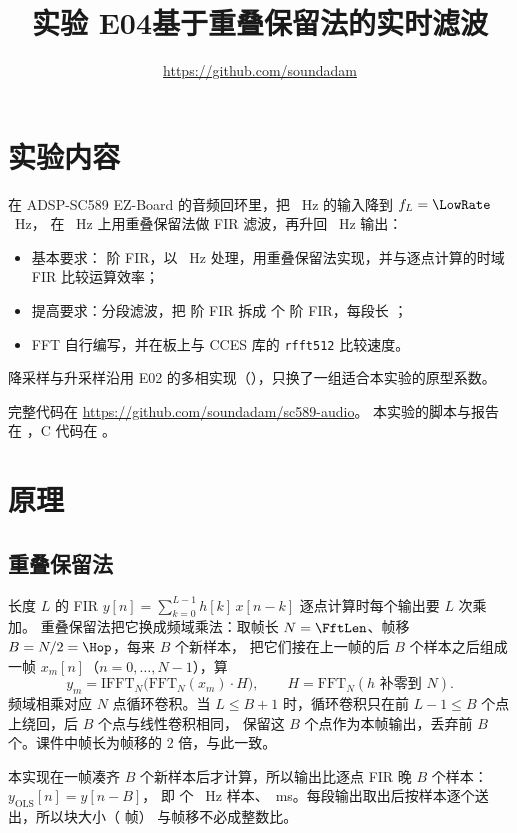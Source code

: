 \documentclass[zihao=-4, linespread=1.5, fontset=none]{ctexart}
\title{实验 E04\quad 基于重叠保留法的实时滤波}
\author{\ReportAuthor\quad\url{https://github.com/soundadam}}
\date{}
\begin{document}
\maketitle

\section{实验内容}

在 ADSP-SC589 EZ-Board 的音频回环里，把 \SampleRate~Hz 的输入降到 $f_L=\LowRate$~Hz，
在 \LowRate~Hz 上用重叠保留法做 FIR 滤波，再升回 \SampleRate~Hz 输出：
\begin{itemize}
  \item 基本要求：\ShortOrder{} 阶 FIR，以 \LowRate~Hz 处理，用重叠保留法实现，并与逐点计算的时域 FIR 比较运算效率；
  \item 提高要求：分段滤波，把 \LongOrder{} 阶 FIR 拆成 \Parts{} 个 \ShortOrder{} 阶 FIR，每段长 \Hop；
  \item FFT 自行编写，并在板上与 CCES 库的 \texttt{rfft512} 比较速度。
\end{itemize}
降采样与升采样沿用 E02 的多相实现（），只换了一组适合本实验的原型系数。

完整代码在 \url{https://github.com/soundadam/sc589-audio}。
本实验的脚本与报告在 ，C 代码在 。

\section{原理}

\subsection{重叠保留法}

长度 $L$ 的 FIR $y[n]=\sum_{k=0}^{L-1}h[k]\,x[n-k]$ 逐点计算时每个输出要 $L$ 次乘加。
重叠保留法把它换成频域乘法：取帧长 $N=\FftLen$、帧移 $B=N/2=\Hop$，每来 $B$ 个新样本，
把它们接在上一帧的后 $B$ 个样本之后组成一帧 $x_m[n]$（$n=0,\dots,N-1$），算
\[
  y_m = \mathrm{IFFT}_N\bigl(\mathrm{FFT}_N(x_m)\cdot H\bigr),\qquad H=\mathrm{FFT}_N(h\text{ 补零到 }N).
\]
频域相乘对应 $N$ 点循环卷积。当 $L\le B+1$ 时，循环卷积只在前 $L-1\le B$ 个点上绕回，后 $B$ 个点与线性卷积相同，
保留这 $B$ 个点作为本帧输出，丢弃前 $B$ 个。课件中帧长为帧移的 2 倍，与此一致。

本实现在一帧凑齐 $B$ 个新样本后才计算，所以输出比逐点 FIR 晚 $B$ 个样本：$y_\text{OLS}[n]=y[n-B]$，
即 \Hop{} 个 \LowRate~Hz 样本、\HopMs~ms。每段输出取出后按样本逐个送出，所以块大小（\BlockFrames{} 帧）
与帧移不必成整数比。
\end{document}
